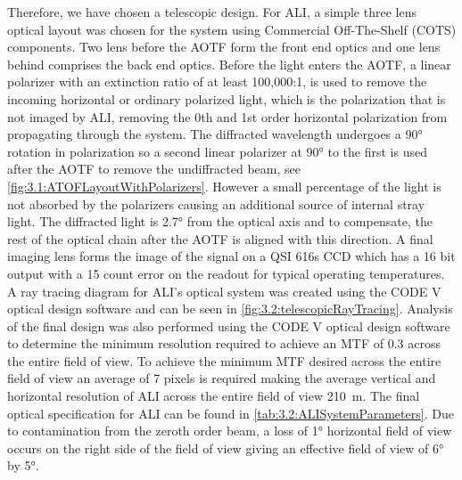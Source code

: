 \documentclass[12pt]{article}
\begin{document}
Therefore, we have chosen a telescopic design. For ALI, a simple three lens optical layout was chosen for the system using Commercial Off-The-Shelf (COTS) components. Two lens before the AOTF form the front end optics and one lens behind comprises the back end optics. Before the light enters the AOTF, a linear polarizer with an extinction ratio of at least 100,000:1, is used to remove the incoming horizontal or ordinary polarized light, which is the polarization that is not imaged by ALI, removing the 0th and 1st order horizontal polarization from propagating through the system. The diffracted wavelength undergoes a 90\si{\degree} rotation in polarization so a second linear polarizer at 90\si{\degree} to the first is used after the AOTF to remove the undiffracted beam, see \autoref{fig:3.1:ATOFLayoutWithPolarizers}. However a small percentage of the light is not absorbed by the polarizers causing an additional source of internal stray light. The diffracted light is 2.7\si{\degree} from the optical axis and to compensate, the rest of the optical chain after the AOTF is aligned with this direction. A final imaging lens forms the image of the signal on a QSI 616s CCD which has a 16 bit output with a 15 count error on the readout for typical operating temperatures. A ray tracing diagram for ALI's optical system was created using the CODE V optical design software and can be seen in \autoref{fig:3.2:telescopicRayTracing}. Analysis of the final design was also performed using the CODE V optical design software to determine the minimum resolution required to achieve an MTF of 0.3 across the entire field of view. To achieve the minimum MTF desired across the entire field of view an average of 7 pixels is required making the average vertical and horizontal resolution of ALI across the entire field of view 210~m. The final optical specification for ALI can be found in \autoref{tab:3.2:ALISystemParameters}. Due to contamination from the zeroth order beam, a loss of 1\si{\degree} horizontal field of view occurs on the right side of the field of view giving an effective field of view of 6\si{\degree} by 5\si{\degree}.
\end{document}
